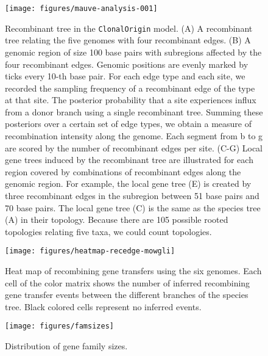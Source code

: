 \documentclass[english]{article}
\begin{document}
\begin{figure}
\texttt{[image: figures/mauve-analysis-001]}
\caption{\label{fig:clonalorigin}Recombinant tree in the \texttt{ClonalOrigin} model.
(A) A recombinant tree relating the five genomes with four recombinant edges.
(B) A genomic region of size 100 base pairs with subregions affected by the
four recombinant edges. Genomic positions are evenly marked by ticks every 10-th
base pair.  For each edge type and each site, we recorded the sampling frequency
of a recombinant edge of the type at that site.  The posterior probability that
a site experiences influx from a donor branch using a single recombinant tree.
Summing these posteriors over a certain set of edge types, we obtain a measure
of recombination intensity along the genome.  Each segment from b to g are
scored by the number of recombinant edges per site.  (C-G) Local gene trees
induced by the recombinant tree are illustrated for each region covered by
combinations of recombinant edges along the genomic region. For example, the
local gene tree (E) is created by three recombinant edges in the subregion
between 51 base pairs and 70 base pairs. The local gene tree (C) is the same as
the species tree (A) in their topology.  Because there are 105 possible rooted
topologies relating five taxa, we could count topologies.}
\end{figure}
\clearpage{}%

\begin{figure}
\begin{center}
\texttt{[image: figures/heatmap-recedge-mowgli]}
\end{center}
\caption{\label{fig:mowgli-recomb-heatmap}Heat map of recombining gene transfers using the
six genomes.
Each cell of the color matrix shows the number of inferred recombining
gene transfer events between the different branches of the species
tree. Black colored cells represent no inferred events.}
\end{figure}
\clearpage{}

\begin{figure}
\begin{center}
\texttt{[image: figures/famsizes]}
\end{center}
\caption{\label{fig:famsizes}Distribution of gene family sizes.}
\end{figure}
\clearpage{}
\end{document}
